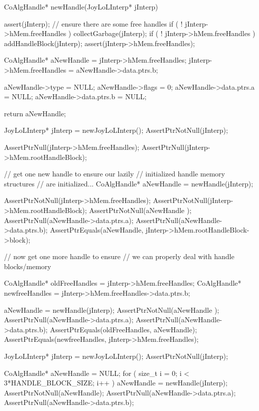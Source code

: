 \startCCode
CoAlgHandle* newHandle(JoyLoLInterp* jInterp) {
  assert(jInterp);
  // ensure there are some free handles
  if ( ! jInterp->hMem.freeHandles ) collectGarbage(jInterp);
  if ( ! jInterp->hMem.freeHandles ) addHandleBlock(jInterp);
  assert(jInterp->hMem.freeHandles);

  CoAlgHandle* aNewHandle   = jInterp->hMem.freeHandles;
  jInterp->hMem.freeHandles = aNewHandle->data.ptrs.b;

  aNewHandle->type        = NULL;
  aNewHandle->flags       = 0;
  aNewHandle->data.ptrs.a = NULL;
  aNewHandle->data.ptrs.b = NULL;

  return aNewHandle;
}
\stopCCode

\startCTest
  JoyLoLInterp* jInterp = newJoyLoLInterp();
  AssertPtrNotNull(jInterp);

  AssertPtrNull(jInterp->hMem.freeHandles);
  AssertPtrNull(jInterp->hMem.rootHandleBlock);

  // get one new handle to ensure our lazily
  // initialized handle memory structures 
  // are initialized...
  CoAlgHandle* aNewHandle = newHandle(jInterp);

  AssertPtrNotNull(jInterp->hMem.freeHandles);
  AssertPtrNotNull(jInterp->hMem.rootHandleBlock);
  AssertPtrNotNull(aNewHandle );
  AssertPtrNull(aNewHandle->data.ptrs.a);
  AssertPtrNull(aNewHandle->data.ptrs.b);
  AssertPtrEquals(aNewHandle,
    jInterp->hMem.rootHandleBlock->block);

  // now get one more handle to ensure
  // we can properly deal with handle blocks/memory
  
  CoAlgHandle* oldFreeHandles =
    jInterp->hMem.freeHandles;
  CoAlgHandle* newfreeHandles = 
    jInterp->hMem.freeHandles->data.ptrs.b;

  aNewHandle = newHandle(jInterp);
  AssertPtrNotNull(aNewHandle );
  AssertPtrNull(aNewHandle->data.ptrs.a);
  AssertPtrNull(aNewHandle->data.ptrs.b);
  AssertPtrEquals(oldFreeHandles, aNewHandle);
  AssertPtrEquals(newfreeHandles, jInterp->hMem.freeHandles);
\stopCTest
\stopTestCase


\startCTest
  JoyLoLInterp* jInterp = newJoyLoLInterp();
  AssertPtrNotNull(jInterp);

  CoAlgHandle* aNewHandle = NULL;
  for ( size_t i = 0; i < 3*HANDLE_BLOCK_SIZE; i++ ) {
    aNewHandle = newHandle(jInterp);
  }
  AssertPtrNotNull(aNewHandle);
  AssertPtrNull(aNewHandle->data.ptrs.a);
  AssertPtrNull(aNewHandle->data.ptrs.b);
\stopCTest
\stopTestCase
\stopTestSuite

